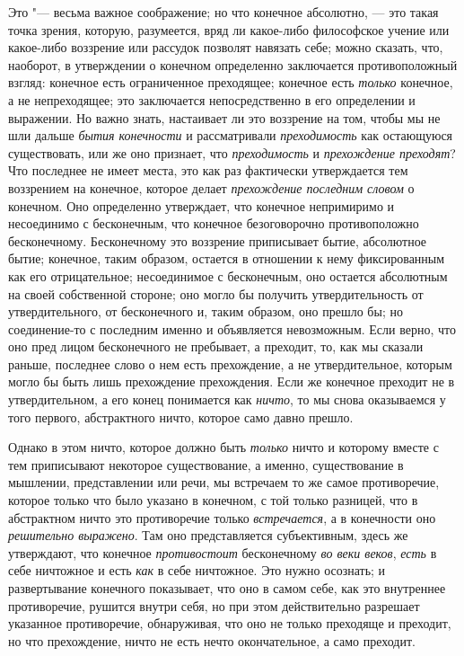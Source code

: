 Это "--- весьма важное соображение; но что конечное абсолютно, — это такая
точка зрения, которую, разумеется, вряд ли какое-либо философское учение
или какое-либо воззрение или рассудок позволят навязать себе; можно
сказать, что, наоборот, в утверждении о конечном определенно заключается
противоположный взгляд: конечное есть ограниченное преходящее; конечное
есть {\em только} конечное, а не непреходящее; это
заключается непосредственно в его определении и выражении. Но важно знать,
настаивает ли это воззрение на том, чтобы мы не шли дальше
{\em бытия конечности} и рассматривали
{\em преходимость} как остающуюся существовать, или же
оно признает, что {\em преходимость} и
{\em прехождение преходят}? Что последнее не имеет
места, это как раз фактически утверждается тем воззрением на конечное,
которое делает {\em прехождение последним словом} о
конечном. Оно определенно утверждает, что конечное непримиримо и
несоединимо с бесконечным, что конечное безоговорочно противоположно
бесконечному. Бесконечному это воззрение приписывает бытие, абсолютное
бытие; конечное, таким образом, остается в отношении к нему фиксированным
как его отрицательное; несоединимое с бесконечным, оно остается абсолютным
на своей собственной стороне; оно могло бы получить утвердительность от
утвердительного, от бесконечного и, таким образом, оно прешло бы; но
соединение-то с последним именно и объявляется невозможным. Если верно, что
оно пред лицом бесконечного не пребывает, а преходит, то, как мы сказали
раньше, последнее слово о нем есть прехождение, а не утвердительное,
которым могло бы быть лишь прехождение прехождения. Если же конечное
преходит не в утвердительном, а его конец понимается как
{\em ничто}, то мы снова оказываемся у того первого,
абстрактного ничто, которое само давно прешло.

Однако в этом ничто, которое должно быть {\em только}
ничто и которому вместе с тем приписывают некоторое существование, а
именно, существование в мышлении, представлении или речи, мы встречаем то
же самое противоречие, которое только что было указано в конечном, с той
только разницей, что в абстрактном ничто это противоречие только
{\em встречается}, а в конечности оно
{\em решительно выражено}. Там оно представляется
субъективным, здесь же утверждают, что конечное
{\em противостоит} бесконечному
{\em во веки веков}, {\em есть} в
себе ничтожное и есть {\em как} в себе ничтожное. Это
нужно осознать; и развертывание конечного показывает, что оно в самом себе,
как это внутреннее противоречие, рушится внутри себя, но при этом
действительно разрешает указанное противоречие, обнаруживая, что оно не
только преходяще и преходит, но что прехождение, ничто не есть нечто
окончательное, а само преходит.

